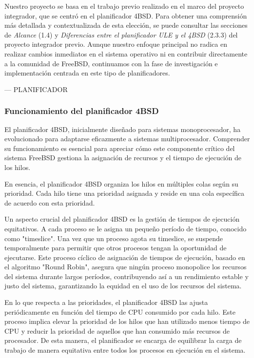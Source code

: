 Nuestro proyecto se basa en el trabajo previo realizado en el marco del proyecto integrador, que se centró en el planificador 4BSD. Para obtener una comprensión más detallada y contextualizada de esta elección, se puede consultar las secciones de \textit{Alcance} (1.4) y  \textit{Diferencias entre el planificador ULE y el 4BSD} (2.3.3) del proyecto integrador previo\cite{bib1}. Aunque nuestro enfoque principal no radica en realizar cambios inmediatos en el sistema operativo ni en contribuir directamente a la comunidad de FreeBSD, continuamos con la fase de investigación e implementación centrada en este tipo de planificadores.\par


--- PLANIFICADOR

\subsubsection{Funcionamiento del planificador 4BSD}

El planificador 4BSD, inicialmente diseñado para sistemas monoprocesador, ha evolucionado para adaptarse eficazmente a sistemas multiprocesador. Comprender su funcionamiento es esencial para apreciar cómo este componente crítico del sistema FreeBSD gestiona la asignación de recursos y el tiempo de ejecución de los hilos.\par

En esencia, el planificador 4BSD organiza los hilos en múltiples colas según su prioridad. Cada hilo tiene una prioridad asignada y reside en una cola específica de acuerdo con esta prioridad.\par

Un aspecto crucial del planificador 4BSD es la gestión de tiempos de ejecución equitativos. A cada proceso se le asigna un pequeño período de tiempo, conocido como "timeslice". Una vez que un proceso agota su timeslice, se suspende temporalmente para permitir que otros procesos tengan la oportunidad de ejecutarse. Este proceso cíclico de asignación de tiempos de ejecución, basado en el algoritmo "Round Robin", asegura que ningún proceso monopolice los recursos del sistema durante largos períodos, contribuyendo así a un rendimiento estable y justo del sistema,  garantizando la equidad en el uso de los recursos del sistema.\par

En lo que respecta a las prioridades, el planificador 4BSD las ajusta periódicamente en función del tiempo de CPU consumido por cada hilo. Este proceso implica elevar la prioridad de los hilos que han utilizado menos tiempo de CPU y reducir la prioridad de aquellos que han consumido más recursos de procesador. De esta manera, el planificador se encarga de equilibrar la carga de trabajo de manera equitativa entre todos los procesos en ejecución en el sistema.\par


